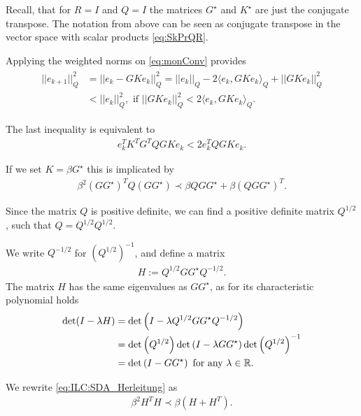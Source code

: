 Recall, that for $R = I$ and $Q = I$ the matrices $G^\star$ and $K^\star$ are just the conjugate transpose. The notation from above can be seen as conjugate transpose in the vector space with scalar products \eqref{eq:SkPrQR}.

Applying the weighted norms on \eqref{eq:monConv} provides
\begin{align}
\begin{split}
||e_{k+1} ||_Q^2 &= ||e_k - G K e_k||_Q^2 = ||e_k||_Q - 2\langle e_k , G K e_k \rangle_Q + ||G K e_k||_Q^2 \\ 
&< ||e_k||_Q^2, \text{ if } ||GK e_k||_Q^2 < 2 \langle e_k, GK e_k\rangle_Q. 
\end{split}
\end{align}

The last inequality is equivalent to 
\begin{align}
e_k^T K^T G^T Q GK e_k < 2 e_k^T Q GK e_k.
\end{align}

If we set $K = \beta G^{\star}$ this is implicated by 
\begin{align}
\label{eq:ILC:SDA_Herleitung}
\beta^2 (G G^{\star})^T Q (G G^{\star}) \prec \beta Q G G^{\star} + \beta (Q G G^{\star})^T.
\end{align}

Since the matrix $Q$ is positive definite, we can find a positive definite 	 matrix $Q^{1/2}$, such that $Q = Q^{1/2}Q^{1/2}$. 

We write $Q^{-1/2}$ for $\left(Q^{1/2}\right)^{-1}$, and define a matrix 
\begin{align}
H :=  Q^{1/2} G G^\star Q^{-1/2}. 
\end{align}
The matrix $H$ has the same eigenvalues as $G G^{\star}$, as for its characteristic polynomial holds 
\begin{align}
\begin{split}
\det (I - \lambda H) &= \det \left(I - \lambda Q^{1/2} G G^\star Q^{-1/2}\right) \\
&= \det\left(Q^{1/2}\right)\det\left(I - \lambda G G^\star\right) \det\left(Q^{1/2}\right)^{-1} \\
&= \det\left(I - G G^\star\right) \text{ for any } \lambda \in {\mathbb{R}}. 
\end{split}
\end{align}

We rewrite \eqref{eq:ILC:SDA_Herleitung} as 
\begin{align}
\beta^2 H^T H \prec \beta (H + H^T). 
\end{align}

